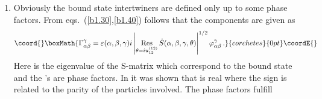 \documentclass[a4paper,a4paper]{article}
\begin{document}
\begin{enumerate}
\item  Obviously the bound state intertwiners are defined only up to some
phase factors. From eqs.~(\ref{b1.30},\ref{b1.40}) follows that the
components are given as 
\[\coord{}\boxMath{
\Gamma _{\alpha \beta }^{\gamma }=\varepsilon (\alpha ,\beta ,\gamma
)i\left| \mathop{\rm Res}_{\theta =iu_{12}^{(12)}}\dot{S}(\alpha ,\beta
,\gamma ,\theta )\right| ^{1/2}\varphi _{\alpha \beta }^{\gamma }\,. 
}{corchetes}{0pt}\coordE{}\]
Here \coordHE{} is the eigenvalue of the
S-matrix \coordHE{} which
correspond to the bound state \myHighlight{$\gamma $}\coordHE{} and the \myHighlight{$\varepsilon $}\coordHE{}'s are phase
factors. In \cite{K1} it was shown that \coordHE{} is real where the sign is related to the parity of the particles
involved. The phase factors \myHighlight{$\varepsilon $}\coordHE{} fulfill \coordHE{}
\end{enumerate}
\end{document}
